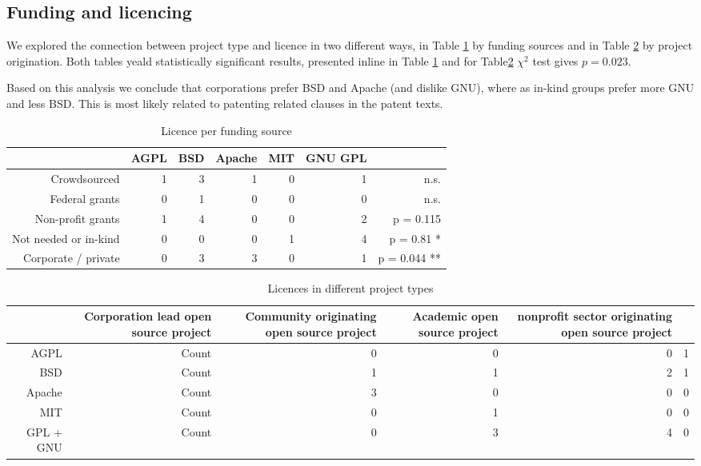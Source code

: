 \subsection{Funding and licencing}

We explored the connection between project type and licence in two different ways, in Table \ref{tab:licence_per_fudning} by funding sources and in Table \ref{tab:licence_per_project_type} by project origination. Both tables yeald statistically significant results, presented inline in Table \ref{tab:licence_per_fudning} and for Table\ref{tab:licence_per_project_type} $\chi^2$ test gives $p=0.023$.

Based on this analysis we conclude that corporations prefer BSD and Apache (and dislike GNU), where as in-kind groups prefer more GNU and less BSD. This is most likely related to patenting related clauses in the patent texts.

\begin{table}[htbp]
  \centering
  \caption{Licence per funding source}
    \begin{tabular}{rrrrrrr}
          & AGPL  & BSD   & Apache & MIT   & GNU GPL &  \\
\hline
    Crowdsourced & 1     & 3     & 1     & 0     & 1     & n.s. \\
    Federal grants & 0     & 1     & 0     & 0     & 0     & n.s. \\
    Non-profit grants & 1     & 4     & 0     & 0     & 2     & p = 0.115 \\
    Not needed or in-kind & 0     & 0     & 0     & 1     & 4     & p = 0.81 * \\
    Corporate / private & 0     & 3     & 3     & 0     & 1     & p = 0.044 ** \\
    \end{tabular}
  \label{tab:licence_per_fudning}
\end{table}

\begin{table}[htbp]
  \centering
  \caption{Licences in different project types}
    \begin{tabular}{rrrrrr}
          & Corporation lead open source project & Community originating open source project & Academic open source project & nonprofit sector originating open source project &  \\
    \hline
    AGPL  & Count & 0     & 0     & 0     & 1 \\
    BSD   & Count & 1     & 1     & 2     & 1 \\
    Apache & Count & 3     & 0     & 0     & 0 \\
    MIT   & Count & 0     & 1     & 0     & 0 \\
    GPL + GNU & Count & 0     & 3     & 4     & 0 \\
    \end{tabular}
  \label{tab:licence_per_project_type}
\end{table}%